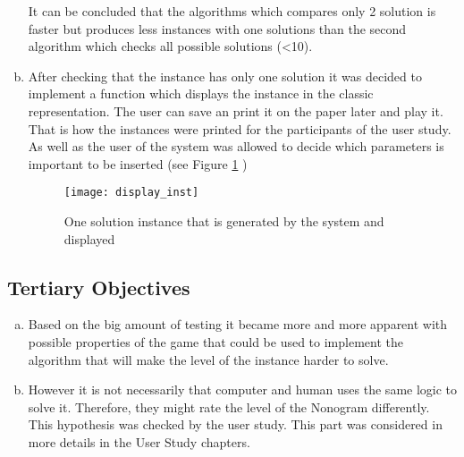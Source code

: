 \begin{enumerate}[(a)]
It can be concluded that the algorithms which compares only 2 solution is faster but produces less instances with one solutions than the second algorithm which checks all possible solutions (<10).
    \item After checking that the instance has only one solution it was decided to implement a function which displays the instance in the classic representation. The user can save an print it on the paper later and play it. That is how the instances were printed for the participants of the user study. As well as the user of the system was allowed to decide which parameters is important to be inserted (see Figure \ref{fig:display} )
   \begin{figure}[h]
   	\centering
   	\texttt{[image: display\_inst]}
   	\caption{One solution instance that is generated by the system and displayed}
   	\label{fig:display}
   \end{figure}
    
\end{enumerate}


\subsection{Tertiary Objectives}
\label{subsec:tertiary_obj}
\begin{enumerate}[(a)]
    \item Based on the big amount of testing it became more and more apparent with possible properties of the game that could be used to implement the algorithm that will make the level of the instance harder to solve.

    \item However it is not necessarily that computer and human uses the same logic to solve it. Therefore, they might rate the level of the Nonogram differently. This hypothesis was checked by the user study. This part was considered in more details in the User Study chapters.
\end{enumerate}

